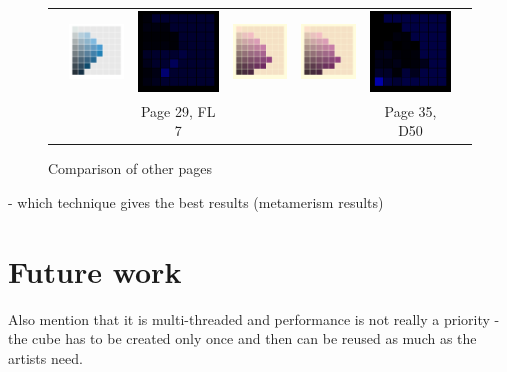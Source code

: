 \begin{figure}[t]
{\begin{tabular}{ccccccc}
			&
			\includegraphics[width=.155\linewidth]{img/results_uplift_page29_ourFL7.png}
			& 
			\includegraphics[width=.155\linewidth]{img/results_uplift_page29_diff_ourFL7.png}
			&\quad
			\includegraphics[width=.155\linewidth]{img/results_uplift_page35_originalD50.png}
			&
			\includegraphics[width=.155\linewidth]{img/results_uplift_page35_ourD50.png}
			&
			\includegraphics[width=.155\linewidth]{img/results_uplift_page35_diff_ourD50.png}\\
			& & Page 29, FL 7 & & & Page 35, D50 & \\
		\end{tabular}
	}
	\caption{Comparison of other pages}
	\label{fig:results_uplift_munsell_other}
\end{figure}

- which technique gives the best results (metamerism results)

\section{Future work}

Also mention that it is multi-threaded and performance is not really a priority - the cube has to be created only once and then can be reused as much as the artists need.
